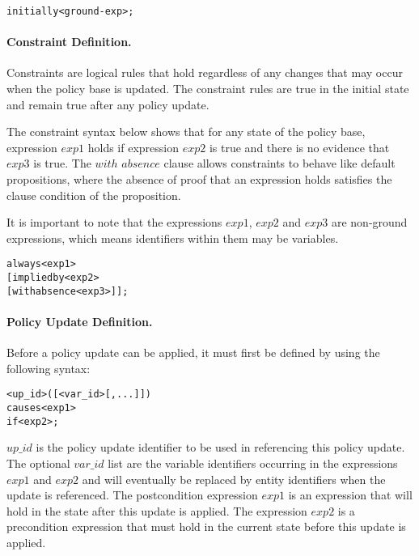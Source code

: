 \documentclass[11pt, twocolumn]{article}
\newenvironment{vverbose}
  {\begin{alltt}}
  {\vspace{-\baselineskip}\end{alltt}}
\begin{document}
          \begin{vverbose}
initially <ground-exp>;
          \end{vverbose}

        \paragraph{Constraint Definition.}

          Constraints are logical rules that hold regardless of any changes
          that may occur when the policy base is updated. The constraint rules
          are true in the initial state and remain true after any policy
          update.

          The constraint syntax below shows that for any state of the policy
          base, expression $exp1$ holds if expression $exp2$ is true and there
          is no evidence that $exp3$ is true. The $with$ $absence$ clause
          allows constraints to behave like default propositions, where the
          absence of proof that an expression holds  satisfies the clause
          condition of the proposition.

          It is important to note that the expressions $exp1$, $exp2$ and
          $exp3$ are non-ground expressions, which means identifiers within
          them may be variables.

          \begin{vverbose}
always <exp1>
  [implied by <exp2>
  [with absence <exp3>]];
          \end{vverbose}

        \paragraph{Policy Update Definition.}

          Before a policy update can be applied, it must first be defined by
          using the following syntax:

          \begin{vverbose}
<up\_id>([<var\_id>[, ...]])
  causes <exp1>
  if <exp2>;
          \end{vverbose}

          $up\_id$ is the policy update identifier to be used in referencing
          this policy update. The optional $var\_id$ list are the variable
          identifiers occurring in the expressions $exp1$ and $exp2$ and will
          eventually be replaced by entity identifiers when the update is
          referenced. The postcondition expression $exp1$ is an expression that
          will hold in the state after this update is applied. The expression
          $exp2$ is a precondition expression that must hold in the current
          state before this update is applied.
\end{document}

